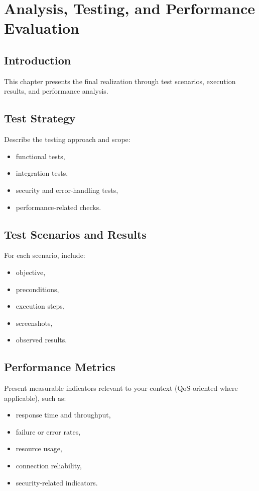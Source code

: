 \chapter{Analysis, Testing, and Performance Evaluation}

\section{Introduction}
This chapter presents the final realization through test scenarios, execution results, and performance analysis.

\section{Test Strategy}
Describe the testing approach and scope:
\begin{itemize}
    \item functional tests,
    \item integration tests,
    \item security and error-handling tests,
    \item performance-related checks.
\end{itemize}

\section{Test Scenarios and Results}
For each scenario, include:
\begin{itemize}
    \item objective,
    \item preconditions,
    \item execution steps,
    \item screenshots,
    \item observed results.
\end{itemize}

\section{Performance Metrics}
Present measurable indicators relevant to your context (QoS-oriented where applicable), such as:
\begin{itemize}
    \item response time and throughput,
    \item failure or error rates,
    \item resource usage,
    \item connection reliability,
    \item security-related indicators.
\end{itemize}

